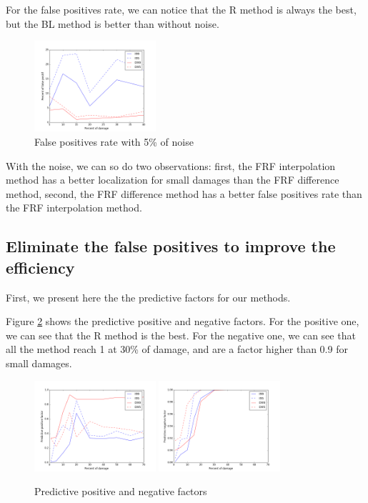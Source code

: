 \documentclass[journal]{IEEEtran}
\begin{document}
For the false positives rate, we can notice that the R method is always the best, but the BL method is better than without noise.


\begin{figure}[h!]
  \centering
  \includegraphics[width=0.4\textwidth]{images/fp004.png}
  \caption{False positives rate with 5\% of noise}
  \label{fp_noise}
\end{figure}


With the noise, we can so do two observations: first, the FRF interpolation method has a better localization for small damages than the FRF difference method, second,  the FRF difference method has a better false positives rate than the FRF interpolation method.


\subsection{Eliminate the false positives to improve the efficiency}

First, we present here the the predictive factors for our methods.

Figure \ref{pred} shows the predictive positive and negative factors. For the positive one, we can see that the R method is the best. For the negative one, we can see that all the method reach 1 at 30\% of damage, and are a factor higher than 0.9 for small damages.

\begin{figure}[h!]
  \centering
  \includegraphics[width=0.4\textwidth]{images/pred.png}
  \includegraphics[width=0.4\textwidth]{images/pred_neg.png}
  \caption{Predictive positive and negative factors}
  \label{pred}
\end{figure}
\end{document}
